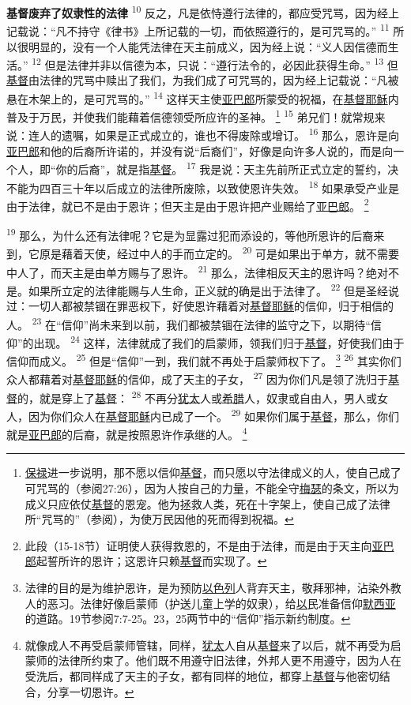 \textbf{基督废弃了奴隶性的法律\quad}
\textsuperscript{10}
反之，凡是依恃遵行法律的，都应受咒骂，因为经上记载说：“凡不持守《律书》上所记载的一切，而依照遵行的，是可咒骂的。”
\textsuperscript{11}
所以很明显的，没有一个人能凭法律在天主前成义，因为经上说：“义人因信德而生活。”
\textsuperscript{12}
但是法律并非以信德为本，只说：“遵行法令的，必因此获得生命。”
\textsuperscript{13}
但\uline{基督}由法律的咒骂中赎出了我们，为我们成了可咒骂的，因为经上记载说：“凡被悬在木架上的，是可咒骂的。”
\textsuperscript{14}
这样天主使\uline{亚巴郎}所蒙受的祝福，在\uline{基督}\uline{耶稣}内普及于万民，并使我们能藉着信德领受所应许的圣神。
\footnote{\uline{保禄}进一步说明，那不愿以信仰\uline{基督}，而只愿以守法律成义的人，使自己成了可咒骂的（参阅27:26），因为人按自己的力量，不能全守\uline{梅瑟}的条文，所以为成义只应依仗\uline{基督}的恩宠。他为拯救人类，死在十字架上，使自己成了法律所“咒骂的”（参阅），为使万民因他的死而得到祝福。}
\textsuperscript{15}
弟兄们！就常规来说：连人的遗嘱，如果是正式成立的，谁也不得废除或增订。
\textsuperscript{16}
那么，恩许是向\uline{亚巴郎}和他的后裔所许诺的，并没有说“后裔们”，好像是向许多人说的，而是向一个人，即“你的后裔”，就是指\uline{基督}。
\textsuperscript{17}
我是说：天主先前所正式立定的誓约，决不能为四百三十年以后成立的法律所废除，以致使恩许失效。
\textsuperscript{18}
如果承受产业是由于法律，就已不是由于恩许；但天主是由于恩许把产业赐给了\uline{亚巴郎}。
\footnote{此段（15-18节）证明使人获得救恩的，不是由于法律，而是由于天主向\uline{亚巴郎}起誓所许的恩许；这恩许只赖\uline{基督}而实现了。}

\textsuperscript{19}
那么，为什么还有法律呢？它是为显露过犯而添设的，等他所恩许的后裔来到，它原是藉着天使，经过中人的手而立定的。
\textsuperscript{20}
可是如果出于单方，就不需要中人了，而天主是由单方赐与了恩许。
\textsuperscript{21}
那么，法律相反天主的恩许吗？绝对不是。如果所立定的法律能赐与人生命，正义就的确是出于法律了。
\textsuperscript{22}
但是圣经说过：一切人都被禁锢在罪恶权下，好使恩许藉着对\uline{基督}\uline{耶稣}的信仰，归于相信的人。
\textsuperscript{23}
在“信仰”尚未来到以前，我们都被禁锢在法律的监守之下，以期待“信仰”的出现。
\textsuperscript{24}
这样，法律就成了我们的启蒙师，领我们归于\uline{基督}，好使我们由于信仰而成义。
\textsuperscript{25}
但是“信仰”一到，我们就不再处于启蒙师权下了。
\footnote{法律的目的是为维护恩许，是为预防\uline{以色列}人背弃天主，敬拜邪神，沾染外教人的恶习。法律好像启蒙师（护送儿童上学的奴隶），给\uline{以}民准备信仰\uline{默西亚}的道路。19节参阅7:7-25。23，25两节中的“信仰”指示新约制度。}
\textsuperscript{26}
其实你们众人都藉着对\uline{基督}\uline{耶稣}的信仰，成了天主的子女，
\textsuperscript{27}
因为你们凡是领了洗归于\uline{基督}的，就是穿上了\uline{基督}：
\textsuperscript{28}
不再分\uline{犹太}人或\uline{希腊}人，奴隶或自由人，男人或女人，因为你们众人在\uline{基督}\uline{耶稣}内已成了一个。
\textsuperscript{29}
如果你们属于\uline{基督}，那么，你们就是\uline{亚巴郎}的后裔，就是按照恩许作承继的人。
\footnote{就像成人不再受启蒙师管辖，同样，\uline{犹太}人自从\uline{基督}来了以后，就不再受为启蒙师的法律所约束了。他们既不用遵守旧法律，外邦人更不用遵守，因为人在受洗后，都同样成了天主的子女，都有同样的地位，都穿上\uline{基督}与他密切结合，分享一切恩许。}

